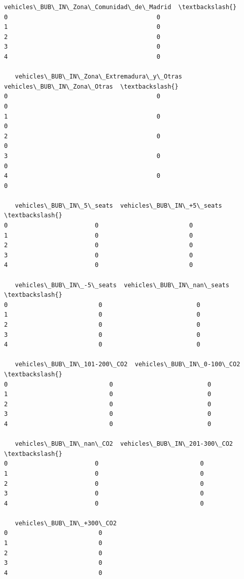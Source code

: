 \documentclass[11pt]{article}
\begin{document}
\begin{tcolorbox}[breakable, size=fbox, boxrule=.5pt, pad at break*=1mm, opacityfill=0]
\begin{Verbatim}[commandchars=\\\{\}]
   vehicles\_BUB\_IN\_Zona\_Comunidad\_de\_Madrid  \textbackslash{}
0                                         0
1                                         0
2                                         0
3                                         0
4                                         0

   vehicles\_BUB\_IN\_Zona\_Extremadura\_y\_Otras  vehicles\_BUB\_IN\_Zona\_Otras  \textbackslash{}
0                                         0                           0
1                                         0                           0
2                                         0                           0
3                                         0                           0
4                                         0                           0

   vehicles\_BUB\_IN\_5\_seats  vehicles\_BUB\_IN\_+5\_seats  \textbackslash{}
0                        0                         0
1                        0                         0
2                        0                         0
3                        0                         0
4                        0                         0

   vehicles\_BUB\_IN\_-5\_seats  vehicles\_BUB\_IN\_nan\_seats  \textbackslash{}
0                         0                          0
1                         0                          0
2                         0                          0
3                         0                          0
4                         0                          0

   vehicles\_BUB\_IN\_101-200\_CO2  vehicles\_BUB\_IN\_0-100\_CO2  \textbackslash{}
0                            0                          0
1                            0                          0
2                            0                          0
3                            0                          0
4                            0                          0

   vehicles\_BUB\_IN\_nan\_CO2  vehicles\_BUB\_IN\_201-300\_CO2  \textbackslash{}
0                        0                            0
1                        0                            0
2                        0                            0
3                        0                            0
4                        0                            0

   vehicles\_BUB\_IN\_+300\_CO2
0                         0
1                         0
2                         0
3                         0
4                         0
\end{Verbatim}
\end{tcolorbox}
        
\end{document}
